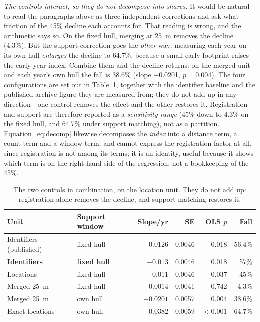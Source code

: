\documentclass{article}
\newcommand{\rOwnHull}{64.7}
\newcommand{\hullLocOlsP}{0.037}
\newcommand{\hullIdsOlsP}{0.018}
\newcommand{\locHullDrop}{45}
\newcommand{\rHullDrop}{57}
\newcommand{\rHullSlope}{-0.013}
\newcommand{\rHullLocSlope}{-0.011}
\begin{document}
\noindent\emph{The controls interact, so they do not decompose into shares.} It would be natural
to read the paragraphs above as three independent corrections and ask what fraction of the
\locHullDrop\% decline each accounts for. That reading is wrong, and the arithmetic says so. On
the fixed hull, merging at \SI{25}{\meter} removes the decline (\num{4.3}\%). But the support
correction goes the \emph{other} way: measuring each year on its own hull \emph{enlarges} the
decline to \rOwnHull\%, because a small early footprint raises the early-year index. Combine them
and the decline returns: on the merged unit and each year's own hull the fall is
\num{38.6}\% (slope \num{-0.0201}, $p = 0.004$). The four configurations are set out in
Table~\ref{tab:factorial}, together with the identifier baseline and the published-archive
figure they are measured from; they do not add up in any direction---one control removes the
effect and the other restores it. Registration and support are therefore reported as a
\emph{sensitivity range} (\locHullDrop\% down to \num{4.3}\% on the fixed hull, and
\rOwnHull\% under support matching), not as a partition. Equation~\eqref{eq:decomp} likewise
decomposes the \emph{index} into a distance term, a count term and a window term, and cannot
express the registration factor at all, since registration is not among its terms; it is an
identity, useful because it shows which term is on the right-hand side of the regression, not a
bookkeeping of the \locHullDrop\%.

\begin{table}[htbp]
\centering
\caption{The two controls in combination, on the location unit. They do not add up: registration alone removes the decline, and support matching restores it.}
\label{tab:factorial}
\footnotesize
\setlength{\tabcolsep}{5pt}
\begin{tabular}{llrrrr}
\toprule
Unit & Support window & Slope/yr & SE & OLS $p$ & Fall \\
\midrule
Identifiers (published) & fixed hull & $-0.0126$ & 0.0046 & 0.018 & 56.4\% \\
\textbf{Identifiers} & \textbf{fixed hull} & $\rHullSlope$ & \num{0.0046} & \hullIdsOlsP & \rHullDrop\% \\
Locations & fixed hull & \rHullLocSlope & \num{0.0046} & \hullLocOlsP & \locHullDrop\% \\
Merged \SI{25}{\meter} & fixed hull & $+0.0014$ & 0.0041 & 0.742 & 4.3\% \\
Merged \SI{25}{\meter} & own hull & $-0.0201$ & 0.0057 & 0.004 & 38.6\% \\
Exact locations & own hull & $-0.0382$ & 0.0059 & $<0.001$ & \rOwnHull\% \\
\bottomrule
\end{tabular}
\end{table}
\end{document}
